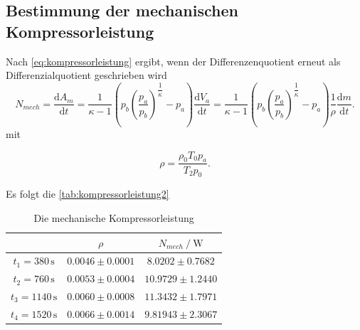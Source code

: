 \subsection{Bestimmung der mechanischen Kompressorleistung}

Nach \eqref{eq:kompressorleistung} ergibt, wenn der Differenzenquotient erneut als Differenzialquotient geschrieben wird
\begin{equation}
N_{mech}= \dfrac{\text{d}A_m}{\text{d}t} = \dfrac{1}{κ-1} \left(p_b\left(\dfrac{p_a}{p_b}\right)^{\dfrac{1}{κ}}-p_a\right) \dfrac{\text{d}V_a}{\text{d}t} = 
    \dfrac{1}{κ-1} \left (p_b \left(\dfrac{p_a}{p_b} \right)^{\dfrac{1}{κ}}-p_a \right) \dfrac{1}{ρ}\dfrac{\text{d}m}{\text{d}t}.
\end{equation}
mit 

\begin{equation*}
\rho = \dfrac{\rho_0 T_0 p_a}{T_2 p_0}.
\end{equation*}

Es folgt die \autoref{tab:kompressorleistung2}

\begin{table}[H]
  \centering
  \label{tab:kompressorleistung2}
  \begin{tabular}{S S S}
    \toprule
    & {$\rho$}&{$N_{mech} \mathbin{/} \unit{\watt}$} \\
    \midrule
    {$t_1 = 380  \, \unit{\second}$} & {$0.0046 \pm 0.0001$} & {$ 8.0202 \pm 0.7682$} \\
    {$t_2 = 760  \, \unit{\second}$} & {$0.0053 \pm 0.0004$} & {$10.9729 \pm 1.2440$} \\
    {$t_3 = 1140 \, \unit{\second}$} & {$0.0060 \pm 0.0008$} & {$11.3432 \pm 1.7971$} \\
    {$t_4 = 1520 \, \unit{\second}$} & {$0.0066 \pm 0.0014$} & {$9.81943 \pm 2.3067$} \\
    \bottomrule
  \end{tabular}
  \caption{Die mechanische Kompressorleistung}
\end{table}


%




